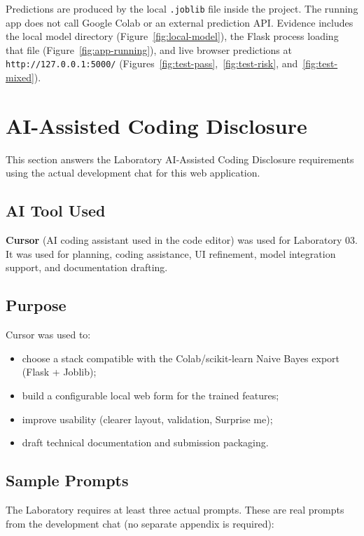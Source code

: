 \documentclass[11pt,a4paper]{article}
\begin{document}
Predictions are produced by the local \texttt{.joblib} file inside the project. The running app does not call Google Colab or an external prediction API. Evidence includes the local model directory (Figure~\ref{fig:local-model}), the Flask process loading that file (Figure~\ref{fig:app-running}), and live browser predictions at \texttt{http://127.0.0.1:5000/} (Figures~\ref{fig:test-pass},~\ref{fig:test-risk}, and~\ref{fig:test-mixed}).

\section{AI-Assisted Coding Disclosure}

This section answers the Laboratory AI-Assisted Coding Disclosure requirements using the actual development chat for this web application.

\subsection*{AI Tool Used}
\textbf{Cursor} (AI coding assistant used in the code editor) was used for Laboratory 03.
It was used for planning, coding assistance, UI refinement, model integration support, and documentation drafting.

\subsection*{Purpose}
Cursor was used to:
\begin{itemize}[leftmargin=*]
  \item choose a stack compatible with the Colab/scikit-learn Naive Bayes export (Flask + Joblib);
  \item build a configurable local web form for the trained features;
  \item improve usability (clearer layout, validation, Surprise me);
  \item draft technical documentation and submission packaging.
\end{itemize}

\subsection*{Sample Prompts}
The Laboratory requires at least three actual prompts. These are real prompts from the development chat (no separate appendix is required):
\end{document}
